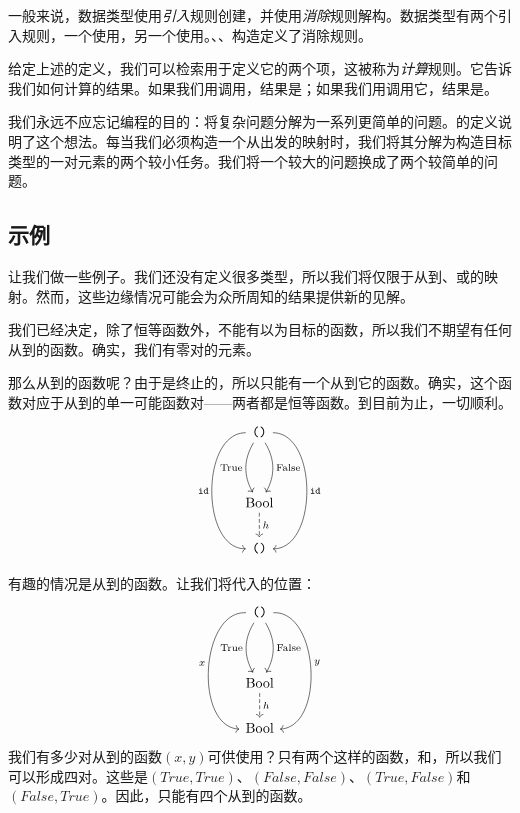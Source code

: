 \documentclass[DaoFP]{subfiles}
\begin{document}
一般来说，数据类型使用\emph{引入}规则创建，并使用\emph{消除}规则解构。数据类型有两个引入规则，一个使用，另一个使用。、、构造定义了消除规则。

给定上述的定义，我们可以检索用于定义它的两个项，这被称为\emph{计算}规则。它告诉我们如何计算的结果。如果我们用调用，结果是；如果我们用调用它，结果是。

我们永远不应忘记编程的目的：将复杂问题分解为一系列更简单的问题。的定义说明了这个想法。每当我们必须构造一个从出发的映射时，我们将其分解为构造目标类型的一对元素的两个较小任务。我们将一个较大的问题换成了两个较简单的问题。

\subsection{示例}

让我们做一些例子。我们还没有定义很多类型，所以我们将仅限于从到、\hask{()}或的映射。然而，这些边缘情况可能会为众所周知的结果提供新的见解。

我们已经决定，除了恒等函数外，不能有以为目标的函数，所以我们不期望有任何从到的函数。确实，我们有零对的元素。

那么从到\hask{()}的函数呢？由于\hask{()}是终止的，所以只能有一个从到它的函数。确实，这个函数对应于从\hask{()}到\hask{()}的单一可能函数对——两者都是恒等函数。到目前为止，一切顺利。
\[
 \begin{tikzcd}
 \hask{()}
 \arrow[dd, bend right, "\text{True}"']
 \arrow[dd, bend left, "\text{False}"]
  \arrow[ddd, bend right =90, "\hask{id}"']
 \arrow[ddd, bend left=90, "\hask{id}"]
\\
 \\
\text{Bool}
\arrow[d, dashed, "h"]
\\
\hask{()}
 \end{tikzcd}
\]

有趣的情况是从到的函数。让我们将代入的位置：
\[
 \begin{tikzcd}
 \hask{()}
 \arrow[dd, bend right, "\text{True}"']
 \arrow[dd, bend left, "\text{False}"]
  \arrow[ddd, bend right =90, "x"']
 \arrow[ddd, bend left=90, "y"]
\\
 \\
\text{Bool}
\arrow[d, dashed, "h"]
\\
\text{Bool}
 \end{tikzcd}
\]
我们有多少对从\hask{()}到的函数$(x, y)$可供使用？只有两个这样的函数，和，所以我们可以形成四对。这些是$(True, True)$、$(False, False)$、$(True, False)$和$(False, True)$。因此，只能有四个从到的函数。
\end{document}
